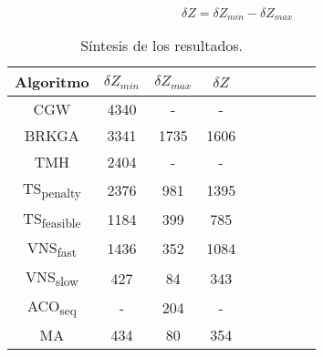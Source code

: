 \begin{equation} \label{eq:DeltaZ}
\delta Z = \delta Z_{min} - \delta Z_{max}
\end{equation}

\bigskip

\begin{table}[!htbp]
\begin{center}
\begin{tabular}{ |c|c|c|c|c|c|c|c|c| } 
\hline
Algoritmo & $\delta Z_{min}$ & $\delta Z_{max}$ & $\delta Z$  \\
\hline
CGW & 4340 & - & -  \\
BRKGA & 3341 & 1735 & 1606  \\
TMH & 2404 & - & -  \\
TS\textsubscript{penalty} & 2376 & 981 & 1395  \\
TS\textsubscript{feasible} & 1184 & 399 & 785  \\
VNS\textsubscript{fast} & 1436 & 352 & 1084  \\
VNS\textsubscript{slow} & 427 & 84 & 343  \\
ACO\textsubscript{seq} & - & 204 & -  \\
MA & 434 & 80 & 354  \\
\hline
\end{tabular}
\end{center}
\caption{Síntesis de los resultados.}
\label{tab:resultadosSintesis}
\end{table}

\bigskip




